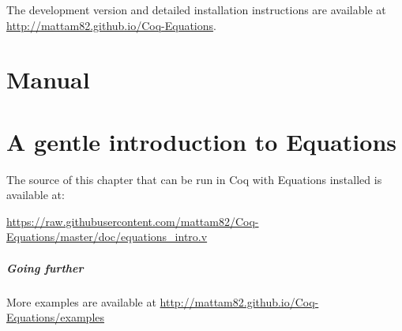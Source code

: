 \documentclass{report}
\begin{document}
The development version and detailed installation instructions are available at
\url{http://mattam82.github.io/Coq-Equations}.

\doparttoc
\parttoc
\tableofcontents

\chapter{Manual}
\label{cha:manual}


\chapter{A gentle introduction to Equations}
\label{cha:gentle-intro}

The source of this chapter that can be run in Coq with Equations
installed is available at:

\url{https://raw.githubusercontent.com/mattam82/Coq-Equations/master/doc/equations_intro.v}



\paragraph{Going further}

More examples are available at \url{http://mattam82.github.io/Coq-Equations/examples}


\label{cha:bibliography}

\end{document}

